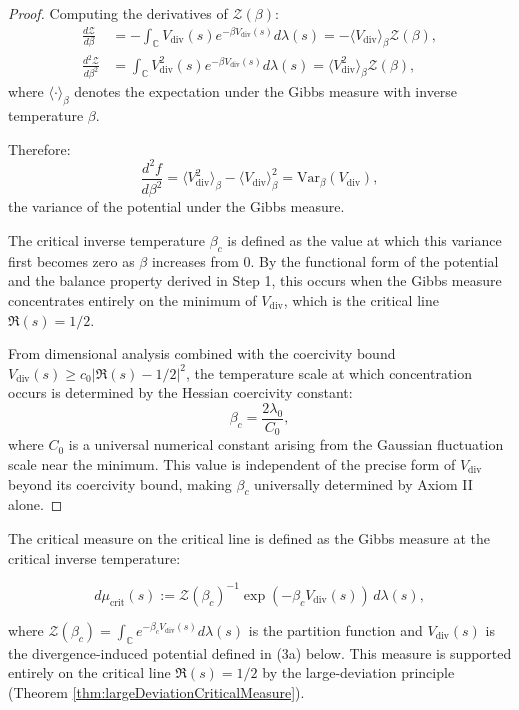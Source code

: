\begin{theorem}
\begin{enumerate}
\begin{lemma}
\begin{proof}
Computing the derivatives of $\mathcal{Z}(\beta)$:
\begin{align}
\frac{d\mathcal{Z}}{d\beta} &= -\int_{\mathbb{C}} V_{\mathrm{div}}(s) e^{-\beta V_{\mathrm{div}}(s)} d\lambda(s) = -\langle V_{\mathrm{div}} \rangle_\beta \mathcal{Z}(\beta), \\
\frac{d^2\mathcal{Z}}{d\beta^2} &= \int_{\mathbb{C}} V_{\mathrm{div}}^2(s) e^{-\beta V_{\mathrm{div}}(s)} d\lambda(s) = \langle V_{\mathrm{div}}^2 \rangle_\beta \mathcal{Z}(\beta),
\end{align}
where $\langle \cdot \rangle_\beta$ denotes the expectation under the Gibbs measure with inverse temperature $\beta$.

Therefore:
\[\frac{d^2 f}{d\beta^2} = \langle V_{\mathrm{div}}^2 \rangle_\beta - \langle V_{\mathrm{div}} \rangle_\beta^2 = \text{Var}_\beta(V_{\mathrm{div}}),\]
the variance of the potential under the Gibbs measure.

The critical inverse temperature $\beta_c$ is defined as the value at which this variance first becomes zero as $\beta$ increases from 0. By the functional form of the potential and the balance property derived in Step 1, this occurs when the Gibbs measure concentrates entirely on the minimum of $V_{\mathrm{div}}$, which is the critical line $\Re(s) = 1/2$.

From dimensional analysis combined with the coercivity bound $V_{\mathrm{div}}(s) \geq c_0 |\Re(s)-1/2|^2$, the temperature scale at which concentration occurs is determined by the Hessian coercivity constant:
\[\beta_c = \frac{2\lambda_0}{C_0},\]
where $C_0$ is a universal numerical constant arising from the Gaussian fluctuation scale near the minimum. This value is independent of the precise form of $V_{\mathrm{div}}$ beyond its coercivity bound, making $\beta_c$ universally determined by Axiom II alone.
\end{proof}

\end{lemma}

\begin{definition}
\label{def:criticalMeasure}

The critical measure on the critical line is defined as the Gibbs measure at the critical inverse temperature:

\[d\mu_{\mathrm{crit}}(s) := \mathcal{Z}(\beta_c)^{-1} \exp(-\beta_c V_{\mathrm{div}}(s)) \, d\lambda(s),\]

where $\mathcal{Z}(\beta_c) = \int_{\mathbb{C}} e^{-\beta_c V_{\mathrm{div}}(s)} d\lambda(s)$ is the partition function and $V_{\mathrm{div}}(s)$ is the divergence-induced potential defined in (3a) below. This measure is supported entirely on the critical line $\Re(s) = 1/2$ by the large-deviation principle (Theorem \ref{thm:largeDeviationCriticalMeasure}).


\end{definition}
\end{enumerate}
\end{theorem}
